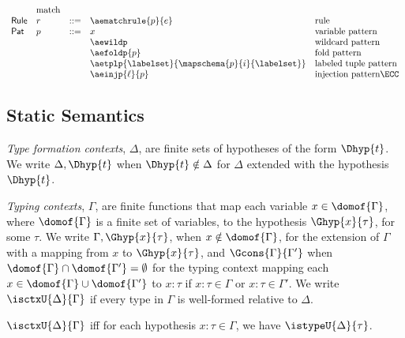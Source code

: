 \[\begin{array}{lllllll}
& \text{match}\\
\mathsf{Rule} & r & ::= 
& \aematchrule{p}{e} 
& \text{rule}\\
\mathsf{Pat} & p & ::= 
& x  
& \text{variable pattern}\\
&&& \aewildp 
& \text{wildcard pattern}\\
&&& \aefoldp{p} 
& \text{fold pattern}\\
&&& \aetplp{\labelset}{\mapschema{p}{i}{\labelset}} 
& \text{labeled tuple pattern}\\
&&& \aeinjp{\ell}{p} 
& \text{injection pattern} \ECC
\end{array}\]

\subsection{Static Semantics}
\emph{Type formation contexts}, $\Delta$, are finite sets of hypotheses of the form $\Dhyp{t}$. We write $\Delta, \Dhyp{t}$ when $\Dhyp{t} \notin \Delta$ for $\Delta$ extended with the hypothesis $\Dhyp{t}$. %

\emph{Typing contexts}, $\Gamma$, are finite functions that map each variable $x \in \domof{\Gamma}$, where $\domof{\Gamma}$ is a finite set of variables, to the hypothesis $\Ghyp{x}{\tau}$, for some $\tau$. We write $\Gamma, \Ghyp{x}{\tau}$, when $x \notin \domof{\Gamma}$, for the extension of $\Gamma$ with a mapping from $x$ to $\Ghyp{x}{\tau}$, and $\Gcons{\Gamma}{\Gamma'}$ when $\domof{\Gamma} \cap \domof{\Gamma'} = \emptyset$ for the typing context mapping each $x \in \domof{\Gamma} \cup \domof{\Gamma'}$ to $x : \tau$ if $x : \tau \in \Gamma$ or $x : \tau \in \Gamma'$. We write $\isctxU{\Delta}{\Gamma}$ if every type in $\Gamma$ is well-formed relative to $\Delta$.
\begin{definition} \label{def:isctxU}
$\isctxU{\Delta}{\Gamma}$ iff for each hypothesis $x : \tau \in \Gamma$, we have $\istypeU{\Delta}{\tau}$.
\end{definition}

